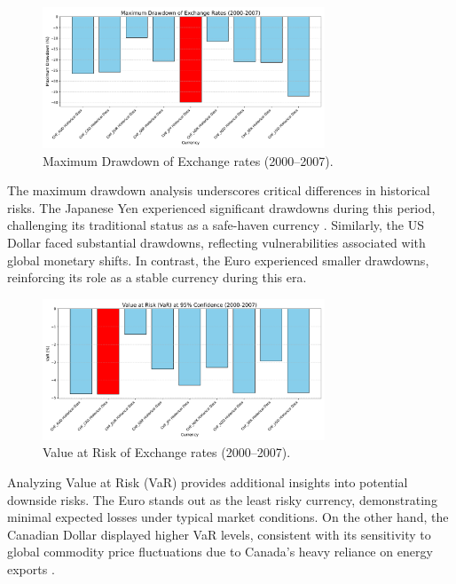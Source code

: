 \documentclass[11pt,a4paper,english,oneside]{book}
\begin{document}
\begin{figure}[h!]
    \centering
    \includegraphics[width=0.75\textwidth]{../../images/maximum_drawdown_2000_2007.pdf}
    \caption{Maximum Drawdown of Exchange rates (2000--2007).}
    \label{fig:maximum_drawdown_2000_2007}
\end{figure}

The maximum drawdown analysis underscores critical differences in historical risks. The Japanese Yen experienced significant drawdowns during this period, challenging its traditional status as a safe-haven currency \parencite{kopyl2016safe}. Similarly, the US Dollar faced substantial drawdowns, reflecting vulnerabilities associated with global monetary shifts. In contrast, the Euro experienced smaller drawdowns, reinforcing its role as a stable currency during this era.

\begin{figure}[h!]
    \centering
    \includegraphics[width=0.75\textwidth]{../../images/var_2000_2007.pdf}
    \caption{Value at Risk of Exchange rates (2000--2007).}
    \label{fig:var_2000_2007}
\end{figure}

Analyzing Value at Risk (VaR) provides additional insights into potential downside risks. The Euro stands out as the least risky currency, demonstrating minimal expected losses under typical market conditions. On the other hand, the Canadian Dollar displayed higher VaR levels, consistent with its sensitivity to global commodity price fluctuations due to Canada's heavy reliance on energy exports \parencite{chen2003commodity}.
\end{document}
